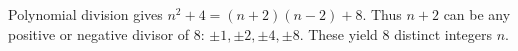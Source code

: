 Polynomial division gives $n^2+4=(n+2)(n-2)+8$. Thus $n+2$ can be any positive or negative divisor of 8: $\pm1,\pm2,\pm4,\pm8$. These yield $\boxed8$ distinct integers $n$.
